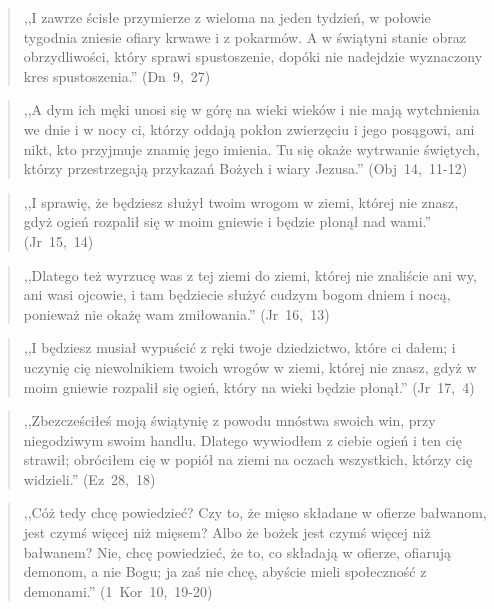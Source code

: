 \documentclass[10pt,a4paper,oneside]{article}
\begin{document}
\begin{quote}
,,I zawrze ścisłe przymierze z wieloma na jeden tydzień, w połowie tygodnia zniesie ofiary krwawe i z pokarmów. A w świątyni stanie obraz obrzydliwości, który sprawi spustoszenie, dopóki nie nadejdzie wyznaczony kres spustoszenia.'' \mbox{(Dn 9, 27)}
\end{quote}
\begin{quote}
,,A dym ich męki unosi się w górę na wieki wieków i nie mają wytchnienia we dnie i w nocy ci, którzy oddają pokłon zwierzęciu i jego posągowi, ani nikt, kto przyjmuje znamię jego imienia. Tu się okaże wytrwanie świętych, którzy przestrzegają przykazań Bożych i wiary Jezusa.'' \mbox{(Obj 14, 11-12)}
\end{quote}
\begin{quote}
,,I sprawię, że będziesz służył twoim wrogom w ziemi, której nie znasz, gdyż ogień rozpalił się w moim gniewie i będzie płonął nad wami.'' \mbox{(Jr 15, 14)}
\end{quote}
\begin{quote}
,,Dlatego też wyrzucę was z tej ziemi do ziemi, której nie znaliście ani wy, ani wasi ojcowie, i tam będziecie służyć cudzym bogom dniem i nocą, ponieważ nie okażę wam zmiłowania.'' \mbox{(Jr 16, 13)}
\end{quote}
\begin{quote}
,,I będziesz musiał wypuścić z ręki twoje dziedzictwo, które ci dałem; i uczynię cię niewolnikiem twoich wrogów w ziemi, której nie znasz, gdyż w moim gniewie rozpalił się ogień, który na wieki będzie płonął.'' \mbox{(Jr 17, 4)}
\end{quote}
\begin{quote}
,,Zbezcześciłeś moją świątynię z powodu mnóstwa swoich win, przy niegodziwym swoim handlu. Dlatego wywiodłem z ciebie ogień i ten cię strawił; obróciłem cię w popiół na ziemi na oczach wszystkich, którzy cię widzieli.'' \mbox{(Ez 28, 18)}
\end{quote}
\begin{quote}
,,Cóż tedy chcę powiedzieć? Czy to, że mięso składane w ofierze bałwanom, jest czymś więcej niż mięsem? Albo że bożek jest czymś więcej niż bałwanem? Nie, chcę powiedzieć, że to, co składają w ofierze, ofiarują demonom, a nie Bogu; ja zaś nie chcę, abyście mieli społeczność z demonami.'' \mbox{(1 Kor 10, 19-20)}
\end{quote}
\end{document}
